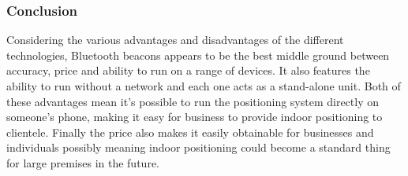 \subsubsection{Conclusion}
Considering the various advantages and disadvantages of the different technologies, Bluetooth beacons appears to be the best middle ground between accuracy, price and ability to run on a range of devices. It also features the ability to run without a network and each one acts as a stand-alone unit. Both of these advantages mean it's possible to run the positioning system directly on someone's phone, making it easy for business to provide indoor positioning to clientele. Finally the price also makes it easily obtainable for businesses and individuals possibly meaning indoor positioning could become a standard thing for large premises in the future.